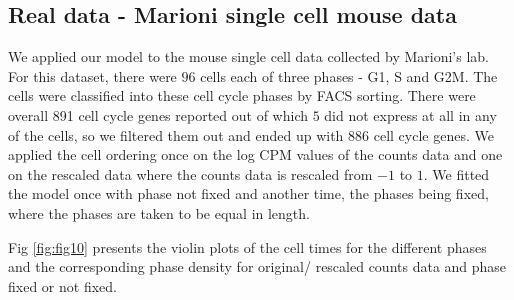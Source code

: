 \documentclass[11pt]{article}
\begin{document}
\subsection{Real data - Marioni single cell mouse data}

We applied our model to the mouse single cell data collected by Marioni's lab. For this dataset, there were $96$ cells each of three phases - G1, S and G2M. The cells were classified into these cell cycle phases by FACS sorting. There were overall 891 cell cycle genes reported out of which $5$ did not express at all in any of the cells, so we filtered them out and ended up with $886$ cell cycle genes. We applied the cell ordering once on the log CPM values of the counts data and one on the rescaled data where the counts data is rescaled from $-1$ to $1$. We fitted the model once with phase not fixed and another time, the phases being fixed, where the phases are taken to be equal in length. 

Fig \ref{fig:fig10} presents the violin plots of the cell times for the different phases and the corresponding phase density for original/ rescaled counts data and phase fixed or not fixed. 
\end{document}
